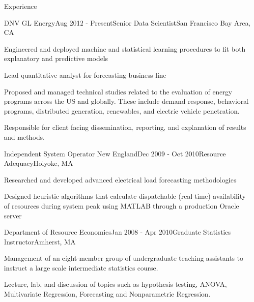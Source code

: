 \documentclass{resume} %
\begin{document}

	\begin{rSection}{Experience}

	\begin{rSubsection}{DNV GL Energy}{Aug 2012 - Present}{Senior Data Scientist}{San Francisco Bay Area, CA}
	\item Engineered and deployed machine and statistical learning procedures to fit both explanatory and predictive models
	\item Lead quantitative analyst for forecasting business line
	\item Proposed and managed technical studies related to the evaluation of energy programs across the US and globally. These include demand response, behavioral programs, distributed generation, renewables, and electric vehicle  penetration. 
	\item Responsible for client facing dissemination, reporting, and explanation of results and methods. 
	
	\end{rSubsection}


	\begin{rSubsection}{Independent System Operator New England}{Dec 2009 - Oct 2010}{Resource Adequacy}{Holyoke, MA}
	\item Researched and developed advanced electrical load forecasting methodologies
	\item Designed heuristic algorithms that calculate dispatchable (real-time) availability of resources during system peak using MATLAB through a production Oracle server
	\end{rSubsection}


	\begin{rSubsection}{Department of Resource Economics}{Jan 2008 - Apr 2010}{Graduate Statistics Instructor}{Amherst, MA}
	\item Management of an eight-member group of undergraduate teaching assistants to instruct a large scale intermediate statistics course.
  \item Lecture, lab, and discussion of topics such as hypothesis testing, ANOVA, Multivariate Regression, Forecasting and Nonparametric Regression.
	\end{rSubsection}

	\end{rSection}
	
\end{document}
